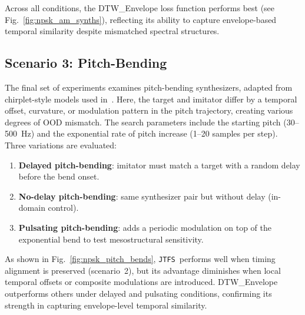 \documentclass[14pt]{extarticle} %
\newcommand{\JTFS}{\texttt{JTFS}\xspace}
\begin{document}
Across all conditions, the DTW\_Envelope loss function performs best (see Fig.~\ref{fig:npsk_am_synths}), reflecting its ability to capture envelope-based temporal similarity despite mismatched spectral structures.



\subsection{Scenario 3: Pitch-Bending}
The final set of experiments examines pitch-bending synthesizers, adapted from chirplet-style models used in~\cite{vahidi2023mesostructures}.  
Here, the target and imitator differ by a temporal offset, curvature, or modulation pattern in the pitch trajectory, creating various degrees of OOD mismatch.  
The search parameters include the starting pitch (30–500~Hz) and the exponential rate of pitch increase (1–20 samples per step).  
Three variations are evaluated:
\begin{enumerate}
  \item \textbf{Delayed pitch-bending}: imitator must match a target with a random delay before the bend onset.  
  \item \textbf{No-delay pitch-bending}: same synthesizer pair but without delay (in-domain control).  
  \item \textbf{Pulsating pitch-bending}: adds a periodic modulation on top of the exponential bend to test mesostructural sensitivity.
\end{enumerate}

As shown in Fig.~\ref{fig:npsk_pitch_bends}, \JTFS\ performs well when timing alignment is preserved (scenario~2), but its advantage diminishes when local temporal offsets or composite modulations are introduced.  
DTW\_Envelope outperforms others under delayed and pulsating conditions, confirming its strength in capturing envelope-level temporal similarity.






\end{document}
